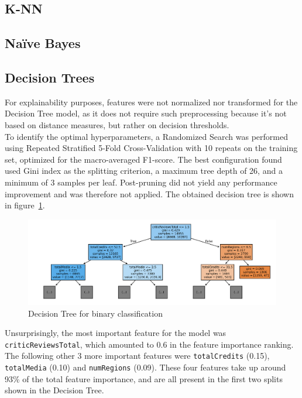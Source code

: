 \subsection{K-NN}


\subsection{Naïve Bayes}


\subsection{Decision Trees}
For explainability purposes, features were not normalized nor transformed for the Decision Tree model,
as it does not require such preprocessing because it's not based on distance measures, but rather on
decision thresholds.\\

To identify the optimal hyperparameters, a Randomized Search was performed
using Repeated Stratified 5-Fold Cross-Validation with 10 repeats on the training set, optimized for
the macro-averaged F1-score.
The best configuration found used Gini index as the splitting criterion,
a maximum tree depth of 26, and a minimum of 3 samples per leaf.
Post-pruning did not yield any performance improvement and was therefore not applied.
The obtained decision tree is shown in figure~\ref{fig:binary_dt}.
\begin{figure}[H]
    \centering
    \includegraphics[width=0.8\linewidth]{plots/binary_dt.png}
    \captionsetup{justification=centering, width=0.9\linewidth}
    \caption{Decision Tree for binary classification}
    \label{fig:binary_dt}
\end{figure}

Unsurprisingly, the most important feature for the model was \texttt{criticReviewsTotal},
which amounted to 0.6 in the feature importance ranking. The following other 3 more important
features were \texttt{totalCredits} (0.15), \texttt{totalMedia} (0.10) and \texttt{numRegions} (0.09).
These four features take up around 93\% of the total feature importance, and are all present in the first
two splits shown in the Decision Tree.\\

